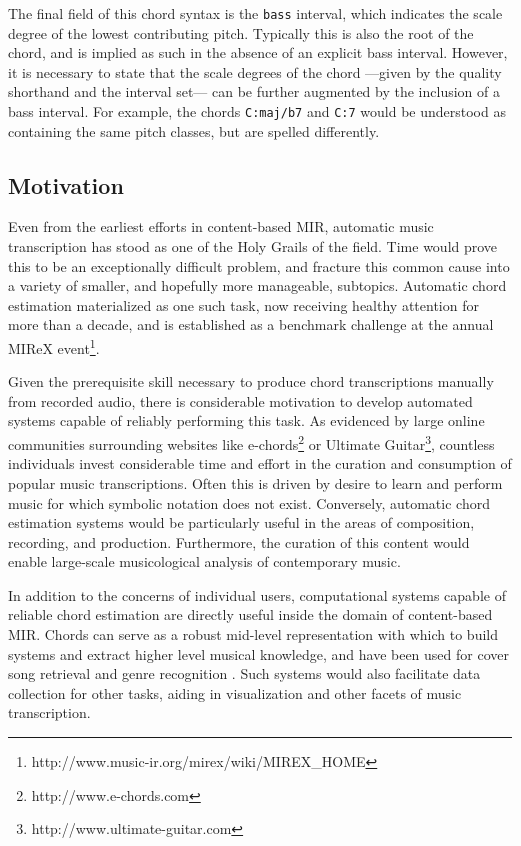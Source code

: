The final field of this chord syntax is the \texttt{bass} interval, which indicates the scale degree of the lowest contributing pitch.
Typically this is also the root of the chord, and is implied as such in the absence of an explicit bass interval.
However, it is necessary to state that the scale degrees of the chord ---given by the quality shorthand and the interval set--- can be further augmented by the inclusion of a bass interval.
For example, the chords \texttt{C:maj/b7} and \texttt{C:7} would be understood as containing the same pitch classes, but are spelled differently.


\subsection{Motivation}
\label{subsec:motivation}

Even from the earliest efforts in content-based MIR, automatic music transcription has stood as one of the Holy Grails of the field.
Time would prove this to be an exceptionally difficult problem, and fracture this common cause into a variety of smaller, and hopefully more manageable, subtopics.
Automatic chord estimation materialized as one such task, now receiving healthy attention for more than a decade, and is established as a benchmark challenge at the annual MIReX event\footnote{{http://www.music-ir.org/mirex/wiki/MIREX\_HOME}}.

Given the prerequisite skill necessary to produce chord transcriptions manually from recorded audio, there is considerable motivation to develop automated systems capable of reliably performing this task.
As evidenced by large online communities surrounding websites like e-chords\footnote{http://www.e-chords.com} or Ultimate Guitar\footnote{http://www.ultimate-guitar.com}, countless individuals invest considerable time and effort in the curation and consumption of popular music transcriptions.
Often this is driven by desire to learn and perform music for which symbolic notation does not exist.
Conversely, automatic chord estimation systems would be particularly useful in the areas of composition, recording, and production.
Furthermore, the curation of this content would enable large-scale musicological analysis of contemporary music.

In addition to the concerns of individual users, computational systems capable of reliable chord estimation are directly useful inside the domain of content-based MIR.
Chords can serve as a robust mid-level representation with which to build systems and extract higher level musical knowledge, and have been used for cover song retrieval \cite{Bello2007Audio} and genre recognition \cite{Anglade2009Genre}.
Such systems would also facilitate data collection for other tasks, aiding in visualization and other facets of music transcription.

